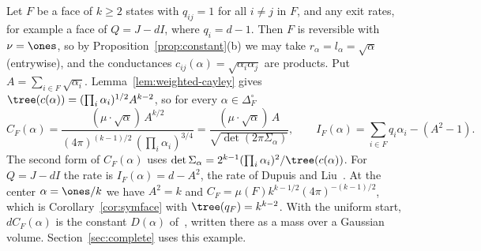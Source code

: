 \begin{example}\label{ex:complete-face}
Let $F$ be a face of $k\ge2$ states with $q_{ij}=1$ for all $i\ne j$ in $F$, and
any exit rates, for example a face of $Q=J-dI$, where $q_i=d-1$. Then $F$ is
reversible with $\nu=\ones$, so by Proposition~\ref{prop:constant}(b) we may take
$r_\alpha=l_\alpha=\sqrt\alpha$ (entrywise), and the conductances
$c_{ij}(\alpha)=\sqrt{\alpha_i\alpha_j}$ are products. Put
$A=\sum_{i\in F}\sqrt{\alpha_i}$. Lemma~\ref{lem:weighted-cayley} gives
$\tree(c(\alpha))=(\prod_i\alpha_i)^{1/2}A^{k-2}$, so for every
$\alpha\in\Delta_F^\circ$
\[
C_F(\alpha)=\frac{(\mu\cdot\sqrt\alpha)\,A^{k/2}}{(4\pi)^{(k-1)/2}\,(\prod_i\alpha_i)^{3/4}}
=\frac{(\mu\cdot\sqrt\alpha)\,A}{\sqrt{\det(2\pi\Sigma_\alpha)}},\qquad
I_F(\alpha)=\sum_{i\in F}q_i\alpha_i-(A^2-1).
\]
The second form of $C_F(\alpha)$ uses $\det\Sigma_\alpha=2^{k-1}(\prod_i\alpha_i)^2/\tree(c(\alpha))$.
For $Q=J-dI$ the rate is $I_F(\alpha)=d-A^2$, the rate of Dupuis and
Liu~\cite[Eq.~(3.2)]{dupuisliu2015}. At the center $\alpha=\ones/k$ we have $A^2=k$
and $C_F=\mu(F)k^{k-1/2}(4\pi)^{-(k-1)/2}$, which is Corollary~\ref{cor:symface}
with $\tree(q_F)=k^{k-2}$. With the uniform start, $dC_F(\alpha)$ is the constant
$D(\alpha)$ of~\cite[Theorem~3.3 and Proposition~3.6]{paperB}, written there as a mass
over a Gaussian volume. Section~\ref{sec:complete} uses this example.
\end{example}

